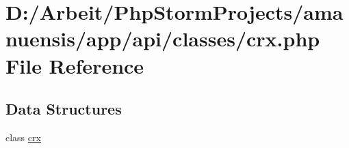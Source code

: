 \hypertarget{a00058}{}\section{D\+:/\+Arbeit/\+Php\+Storm\+Projects/amanuensis/app/api/classes/crx.php File Reference}
\label{a00058}
\subsection*{Data Structures}
\begin{DoxyCompactItemize}
\item 
class \hyperlink{a00020}{crx}
\end{DoxyCompactItemize}
